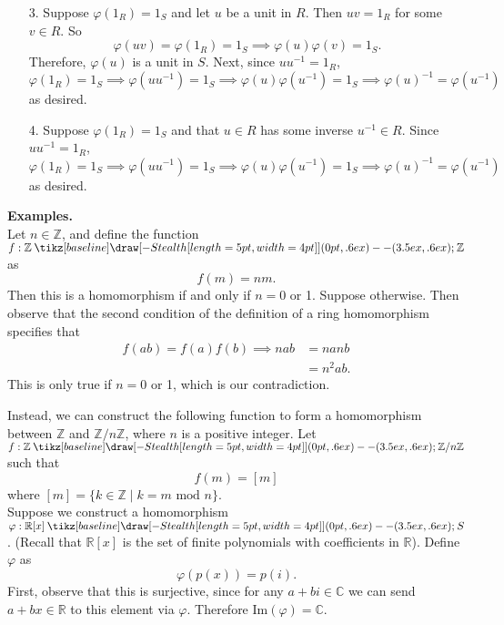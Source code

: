 \documentclass[12pt,letterpaper]{algebra_book}
\renewcommand{\to}{\mathbin{\tikz[baseline] \draw[-{Stealth[length=5pt,width=4pt]}] (0pt,.6ex) -- (3.5ex,.6ex);}}
\newcommand{\im}{\mbox{Im}}
\newcommand{\ZZ}{\mathbb{Z}}
\newcommand{\RR}{\mathbb{R}}
\renewcommand{\phi}{\varphi}
\theoremstyle{definition}
\begin{document}
\begin{prf}
\begin{itemize}
            \item[3.] Suppose $\phi(1_R) = 1_S$ and 
            let $u$ be a unit in $R$. Then $uv =
            1_R$ for some $v \in R$. So 
            \[
                \phi(uv) = \phi(1_R) = 1_S \implies \phi(u)\phi(v) = 1_S.        
            \]
            Therefore, $\phi(u)$ is a unit in $S$. Next, since $uu^{-1} =
            1_R$,
            \[
                \phi(1_R) = 1_S \implies \phi(uu^{-1}) = 1_S \implies 
                \phi(u)\phi(u^{-1}) = 1_S \implies \phi(u)^{-1} = \phi(u^{-1})
            \]
            as desired.
            
            \item[4.] Suppose $\phi(1_R) = 1_S$ and that $u \in R$ has
            some inverse $u^{-1} \in R$.
            Since $uu^{-1} = 1_R$,
            \[
                \phi(1_R) = 1_S \implies \phi(uu^{-1}) = 1_S \implies 
                \phi(u)\phi(u^{-1}) = 1_S \implies \phi(u)^{-1} = \phi(u^{-1})
            \]
            as desired.
            
        \end{itemize}
    \end{prf}

    

    \noindent\textbf{Examples.}\\
    Let $n \in \ZZ$, and define the function
    $f: \ZZ \to \ZZ$ as 
    \[
        f(m) = nm.
    \]
    Then this is a homomorphism if and only if $n = 0$ or 1.
    Suppose otherwise. Then observe that the second condition of
    the definition of a ring homomorphism specifies that 
    \begin{align*}
        f(ab) = f(a)f(b) \implies nab &= nanb \\
        & = n^2ab.
    \end{align*}
    This is only true if $n = 0$ or 1, which is our contradiction.

    Instead, we can construct the following function to form a
    homomorphism between $\ZZ$ and $\ZZ/n\ZZ$, where $n$ is a
    positive integer. Let $f: \ZZ \to \ZZ/n\ZZ$ such that 
    \[
        f(m) = [m]
    \]
    where $[m] = \{k \in \ZZ \mid k = m \mbox{ mod } n\}$.
    \\

    Suppose we construct a homomorphism $\phi: \mathbb{R}[x] \to
    S$. (Recall that $\RR[x]$ is the set of finite polynomials
    with coefficients in $\RR$). Define $\phi$ as  
    \[
        \phi(p(x)) = p(i).
    \]
    First, observe that this is surjective, since for any $a + bi
    \in \mathbb{C}$ we can send $a + bx \in \RR$ to this element
    via $\phi$. Therefore $\im(\phi) = \mathbb{C}$. 
\end{document}
